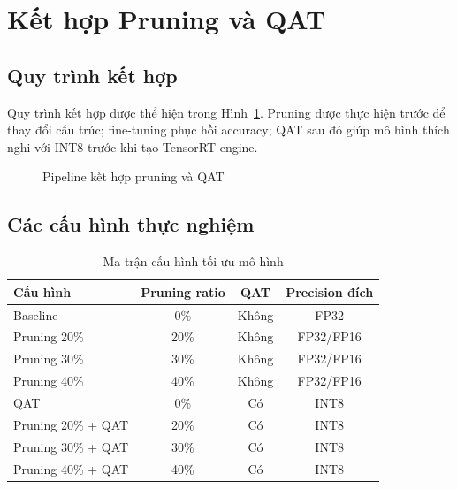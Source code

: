 \section{Kết hợp Pruning và QAT}

\subsection{Quy trình kết hợp}

Quy trình kết hợp được thể hiện trong Hình~\ref{fig:pruning-qat-pipeline}. Pruning
được thực hiện trước để thay đổi cấu trúc; fine-tuning phục hồi accuracy; QAT sau
đó giúp mô hình thích nghi với INT8 trước khi tạo TensorRT engine.

\begin{figure}[H]
\centering
{}
\caption{Pipeline kết hợp pruning và QAT}
\label{fig:pruning-qat-pipeline}
\end{figure}

\subsection{Các cấu hình thực nghiệm}

\begin{table}[H]
\centering
\caption{Ma trận cấu hình tối ưu mô hình}
\label{tab:optimization-configs}
\begin{tabular}{lccc}
\toprule
\textbf{Cấu hình} & \textbf{Pruning ratio} & \textbf{QAT} & \textbf{Precision đích}\\
\midrule
Baseline & 0\% & Không & FP32\\
Pruning 20\% & 20\% & Không & FP32/FP16\\
Pruning 30\% & 30\% & Không & FP32/FP16\\
Pruning 40\% & 40\% & Không & FP32/FP16\\
QAT & 0\% & Có & INT8\\
Pruning 20\% + QAT & 20\% & Có & INT8\\
Pruning 30\% + QAT & 30\% & Có & INT8\\
Pruning 40\% + QAT & 40\% & Có & INT8\\
\bottomrule
\end{tabular}
\end{table}

